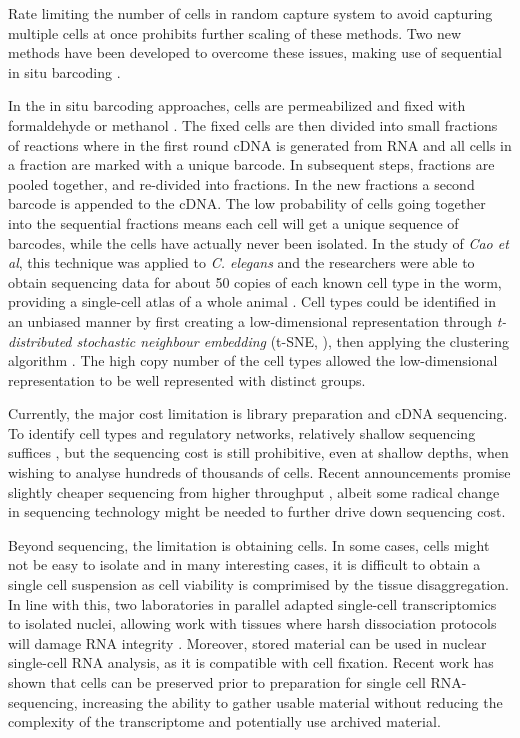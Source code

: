 Rate limiting the number of cells in random capture system to avoid capturing multiple cells at once prohibits further scaling of these methods. Two new methods have been developed to overcome these issues, making use of sequential in situ barcoding \cite{Rosenberg2017-jt, Cao2017-ux}.

In the in situ barcoding approaches, cells are permeabilized and fixed with formaldehyde \cite{Rosenberg2017-jt} or methanol \cite{Cao2017-ux}. The fixed cells are then divided into small fractions of reactions where in the first round cDNA is generated from RNA and all cells in a fraction are marked with a unique barcode. In subsequent steps, fractions are pooled together, and re-divided into fractions. In the new fractions a second barcode is appended to the cDNA. The low probability of cells going together into the sequential fractions means each cell will get a unique sequence of barcodes, while the cells have actually never been isolated. In the study of \textit{Cao et al}, this technique was applied to \textit{C. elegans} and the researchers were able to obtain sequencing data for about 50 copies of each known cell type in the worm, providing a single-cell atlas of a whole animal \cite{Cao2017-ux}. Cell types could be identified in an unbiased manner by first creating a low-dimensional representation through \textit{t-distributed stochastic neighbour embedding} (t-SNE, \citet{Van_der_Maaten2008-lh}), then applying the  clustering algorithm \cite{Rodriguez2014-mc}. The high copy number of the cell types allowed the low-dimensional representation to be well represented with distinct groups.

Currently, the major cost limitation is library preparation and cDNA sequencing. To identify cell types and regulatory networks, relatively shallow sequencing suffices \cite{Heimberg2016-qw, Pollen2014-cs}, but the sequencing cost is still prohibitive, even at shallow depths, when wishing to analyse hundreds of thousands of cells. Recent announcements promise slightly cheaper sequencing from higher throughput \cite{Illumina_Inc2017-zg}, albeit some radical change in sequencing technology might be needed to further drive down sequencing cost.

Beyond sequencing, the limitation is obtaining cells. In some cases, cells might not be easy to isolate and in many interesting cases, it is difficult to obtain a single cell suspension as cell viability is comprimised by the tissue disaggregation. In line with this, two laboratories in parallel adapted single-cell transcriptomics to isolated nuclei, allowing work with tissues where harsh dissociation protocols will damage RNA integrity \cite{Habib2016-jm, Habib2017-jk, Lake2016-zb}. Moreover, stored material can be used in nuclear single-cell RNA analysis, as it is compatible with cell fixation. Recent work has shown that cells can be preserved prior to preparation for single cell RNA-sequencing, increasing the ability to gather usable material without reducing the complexity of the transcriptome \cite{Guillaumet-Adkins2017-po, Alles2017-vi} and potentially use archived material.

